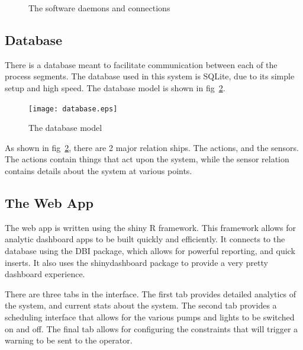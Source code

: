 \documentclass[american,12pt]{article}
\begin{document}
\begin{figure}[h]
    \centering
    \caption{The software daemons and connections}
    \label{fig:Software Architecture}
\end{figure}

\subsection{Database}
There is a database meant to facilitate communication between each of the 
process segments. The database used in this system is SQLite, due to its
simple setup and high speed. The database model is shown in 
fig~\ref{fig:database}.

\begin{figure}[h]
	\texttt{[image: database.eps]}
	\caption{The database model}
	\label{fig:database}
\end{figure}

As shown in fig~\ref{fig:database}, there are 2 major relation ships. The
actions, and the sensors. The actions contain things that act upon the
system, while the sensor relation contains details about the system at
various points.


\subsection{The Web App}
The web app is written using the shiny R framework. This framework allows for 
analytic dashboard apps to be built quickly and efficiently. It connects to
the database using the DBI package, which allows for powerful reporting, and
quick inserts. It also uses the shinydashboard package to provide a very
pretty dashboard experience.

There are three tabs in the interface. The first tab provides detailed
analytics of the system, and current stats about the system. The second
tab provides a scheduling interface that allows for the various pumps
and lights to be switched on and off. The final tab allows for 
configuring the constraints that will trigger a warning to be sent to
the operator.
\end{document}
